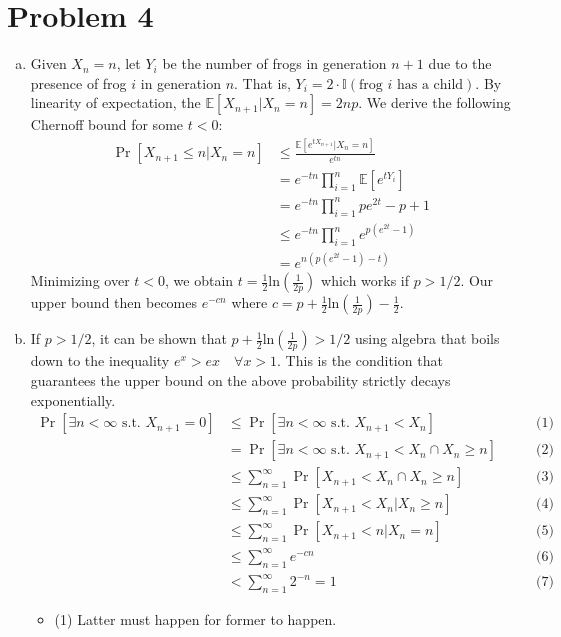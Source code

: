 \documentclass[11pt]{article}
\newcommand{\E}{\mathbb{E}}
\newcommand{\p}[1]{\left(#1\right)}
\renewcommand{\ln}[1]{\text{ln}\p{#1}}
\begin{document}
\section*{Problem 4}
\begin{enumerate}[(a)]
\item Given $X_n=n$, let $Y_i$ be the number of frogs in generation $n+1$ due to the presence of frog $i$ in generation $n$. That is, $Y_i=2\cdot\mathbb{I}(\text{frog }i\text{ has a child})$. By linearity of expectation, the $\E[X_{n+1}|X_n=n]=2np$. We derive the following Chernoff bound for some $t<0$:
\begin{align*}
\Pr[X_{n+1}\leq n|X_n=n] &\leq \frac{\E[e^{tX_{n+1}}|X_n=n]}{e^{tn}}\\
&= e^{-tn}\prod_{i=1}^n\E[e^{tY_i}]\\
&= e^{-tn}\prod_{i=1}^npe^{2t}-p+1\\
&\leq e^{-tn}\prod_{i=1}^ne^{p(e^{2t}-1)}\\
&= e^{n(p(e^{2t}-1)-t)}
\end{align*}
Minimizing over $t<0$, we obtain $t=\frac12\ln{\frac1{2p}}$ which works if $p>1/2$. Our upper bound then becomes $e^{-cn}$ where $c=p+\frac12\ln{\frac1{2p}}-\frac12$.
\item If $p>1/2$, it can be shown that $p+\frac12\ln{\frac1{2p}}>1/2$ using algebra that boils down to the inequality $e^x>ex\quad\forall x>1$. This is the condition that guarantees the upper bound on the above probability strictly decays exponentially.
\begin{align*}
\Pr[\exists n<\infty\text{ s.t. }X_{n+1}=0] &\leq \Pr[\exists n<\infty\text{ s.t. }X_{n+1}< X_n] & \qquad\text{(1)}\\
&= \Pr[\exists n<\infty\text{ s.t. }X_{n+1}< X_n\cap X_n\geq n] & \qquad\text{(2)}\\
&\leq \sum_{n=1}^{\infty}\Pr[X_{n+1}< X_n\cap X_n\geq n] & \qquad\text{(3)}\\
&\leq \sum_{n=1}^{\infty}\Pr[X_{n+1}< X_n| X_n\geq n] & \qquad\text{(4)}\\
&\leq \sum_{n=1}^{\infty}\Pr[X_{n+1}< n| X_n=n] & \qquad\text{(5)}\\
&\leq \sum_{n=1}^{\infty}e^{-cn} & \qquad\text{(6)}\\
&< \sum_{n=1}^{\infty}2^{-n}=1 & \qquad\text{(7)}
\end{align*}
\begin{itemize}
\item (1) Latter must happen for former to happen.

\end{itemize}
\end{enumerate}
\end{document}
